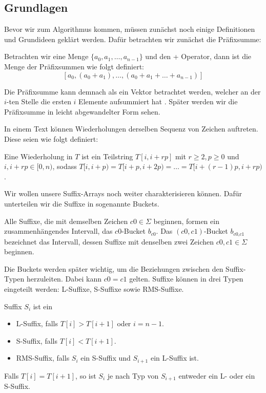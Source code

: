 \subsection{Grundlagen}
Bevor wir zum Algorithmus kommen, müssen zunächst noch einige Definitionen und Grundideen geklärt werden. Dafür betrachten wir zunächst die Präfixsumme:

\begin{definition}
	Betrachten wir eine Menge $\{a_0, a_1, \dots , a_{n-1}\}$ und den + Operator, dann ist die Menge der Präfixsummen wie folgt definiert:
	$$
	[a_0, (a_0 + a_1), \dots , (a_0 + a_1 + \dots + a_{n-1})]
	$$
\end{definition}
Die Präfixsumme kann demnach als ein Vektor betrachtet werden, welcher an der $i$-ten Stelle die ersten $i$ Elemente aufsummiert hat \cite{Blelloch90}. Später werden wir die Präfixsumme in leicht abgewandelter Form sehen.

In einem Text können Wiederholungen derselben Sequenz von Zeichen auftreten. Diese seien wie folgt definiert:
\begin{definition}
	\label{repetition}
	Eine Wiederholung in $T$ ist ein Teilstring $T[i, i + rp]$ mit $ r \geq 2, p \geq 0$ und $i, i + rp \in [0, n)$, sodass $T[i, i+p) = T[i + p, i + 2p) = \dots = T[i + (r-1)p, i + rp)$.
\end{definition}

Wir wollen unsere Suffix-Arrays noch weiter charakterisieren können. Dafür unterteilen wir die Suffixe in sogenannte Buckets.

\begin{definition}
	Alle Suffixe, die mit demselben Zeichen $c0 \in \Sigma$ beginnen, formen ein zusammenhängendes Intervall, das $c0$-Bucket $b_{\textit{c0}}$. Das $(c0,c1)$-Bucket $b_{\textit{c0,c1}}$ bezeichnet das Intervall, dessen Suffixe mit denselben zwei Zeichen $c0,c1 \in \Sigma$ beginnen.
\end{definition}

Die Buckets werden später wichtig, um die Beziehungen zwischen den Suffix-Typen herzuleiten. Dabei kann $c0=c1$ gelten. Suffixe können in drei Typen eingeteilt werden: L-Suffixe, S-Suffixe sowie RMS-Suffixe.

\begin{definition}
	Suffix $S_i$ ist ein
	\begin{itemize}
		\item L-Suffix, falls $T[i] > T[i+1]$ oder $i=n-1$.
		\item S-Suffix, falls $T[i] < T[i+1]$.
		\item RMS-Suffix, falls $S_i$ ein S-Suffix und $S_{i+1}$ ein L-Suffix ist.
	\end{itemize}
	Falls $T[i] = T[i+1]$, so ist $S_i$ je nach Typ von $S_{i+1}$ entweder ein L- oder ein S-Suffix.
\end{definition}


